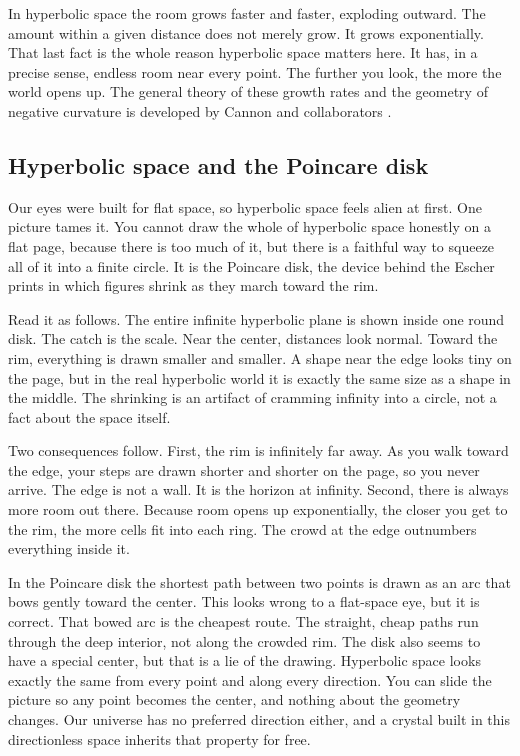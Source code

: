 In hyperbolic space the room grows faster and faster, exploding outward. The amount within a given distance
does not merely grow. It grows exponentially. That last fact is the whole reason hyperbolic space matters
here. It has, in a precise sense, endless room near every point. The further you look, the more the world
opens up. The general theory of these growth rates and the geometry of negative curvature is developed by
Cannon and collaborators \cite{cannon1997}.

\subsection{Hyperbolic space and the Poincare disk}

Our eyes were built for flat space, so hyperbolic space feels alien at first. One picture tames it. You
cannot draw the whole of hyperbolic space honestly on a flat page, because there is too much of it, but
there is a faithful way to squeeze all of it into a finite circle. It is the Poincare disk, the device
behind the Escher prints in which figures shrink as they march toward the rim.

Read it as follows. The entire infinite hyperbolic plane is shown inside one round disk. The catch is the
scale. Near the center, distances look normal. Toward the rim, everything is drawn smaller and smaller. A
shape near the edge looks tiny on the page, but in the real hyperbolic world it is exactly the same size as
a shape in the middle. The shrinking is an artifact of cramming infinity into a circle, not a fact about the
space itself.

Two consequences follow. First, the rim is infinitely far away. As you walk toward the edge, your steps are
drawn shorter and shorter on the page, so you never arrive. The edge is not a wall. It is the horizon at
infinity. Second, there is always more room out there. Because room opens up exponentially, the closer you
get to the rim, the more cells fit into each ring. The crowd at the edge outnumbers everything inside it.

In the Poincare disk the shortest path between two points is drawn as an arc that bows gently toward the
center. This looks wrong to a flat-space eye, but it is correct. That bowed arc is the cheapest route. The
straight, cheap paths run through the deep interior, not along the crowded rim. The disk also seems to have
a special center, but that is a lie of the drawing. Hyperbolic space looks exactly the same from every
point and along every direction. You can slide the picture so any point becomes the center, and nothing
about the geometry changes. Our universe has no preferred direction either, and a crystal built in this
directionless space inherits that property for free.

